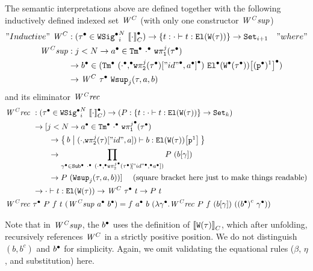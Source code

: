 The semantic interpretations above are defined together with the following inductively defined indexed set $\mathit{W}^C$ (with only one constructor $\mathit{W^Csup}$)
%
\begin{align*}
  "Inductive"~\mathit{W}^C &: ({\tau}^\bullet \in {\ensuremath{{\texttt{WSig}}^\bullet}}_{i}^{N}~{{\llbracket {\cdot} \rrbracket}_C^\bullet}) \to \{ t :  {\cdot} \vdash {t} : {\texttt{El}({\texttt{W}({\tau})})}  \} \to \texttt{Set}_{i + 1} \quad "where" \\
    \mathit{W^Csup} &: j < N \to {a}^\bullet \in {\texttt{Tm}}^\bullet~{{\cdot}^\bullet}~{\texttt{w}\pi^{j}_{\texttt{1}}({{\tau}^\bullet})} \\
    & \to {b}^\bullet \in ({\texttt{Tm}}^\bullet~{({\cdot}^\bullet {,}^\bullet {\ensuremath{\texttt{w}\pi^{j}_{\texttt{2}}({{\tau}^\bullet})}}\!\left[{{{"id"}^\bullet},{{a}^\bullet}}\right]^\bullet) }~{{{\texttt{El}}^\bullet({{\texttt{W}}^\bullet({{\tau}^\bullet})})}\!\left[{(\texttt{p}^\bullet)^{1}}\right]^\bullet}) \\
    & \to \mathit{W}^C~{\tau}^\bullet~\texttt{Wsup}_{j}({\tau},{a},{b})
\end{align*}
and its eliminator $\mathit{W^Crec}$
\begin{align*}
  \CWrec \  &: (\Glued{\wsig} \in \GWSig{i}{\denotesCC{\cdot}}{N}) \to 
    (P : \{ t : \goodTerm{\cdot}{t}{\El{\wcode{\wsig}}} \} \to \Set{k})  \\
    & \to 
    [j < N \to  \Glued{a} \in \GTm{\Glued{\cdot}}{\Gwsigproj{j}{1}{\Glued{\wsig}}} \\ 
    & \quad \quad \to 
    \setc{b}{\goodTerm{({\cdot} {,} \sub{\wsigproj{j}{2}{{\wsig}}}{\SubstExt{"id"}{{a}}}) }{b}{\sub{\El{\wcode{\wsig}}}{\SubstWeak{1}}}} \\ 
    & \quad \quad \to  \prod_{\Glued{\gm} \in \GSub{\Glued{\cdot}}{(\Glued{\cdot} \Glued{,} \sub{\Gwsigproj{j}{2}{\Glued{\wsig}}}{\GSubstExt{\GSubstId}{\Glued{a}}})}} P~(\sub{b}{ \gm }) \\
    & \quad \quad \to P~(\Wsup{j}{\wsig}{a}{b}) ] \quad \text{ (square bracket here just to make things readable)} \\
    & \to \goodTerm{\cdot}{t}{\El{\wcode{\wsig}}} \to \CWmodel~\Glued{\wsig}~t \to P~t \\
  \CWrec \  & \Glued{\wsig}~P~f~t~(\CWsup~\Glued{a}~\Glued{b}) = f~\Glued{a}~b~(\lambda \Glued{\gm}. \CWrec~P~f~(\sub{b}{\gm})~(\Gmodel{\Glued{b}}~\Glued{\gm}))
\end{align*}

Note that in $\mathit{W^Csup}$, the ${b}^\bullet$ uses the definition of
${\llbracket {\ensuremath{\texttt{W}({\tau})}} \rrbracket}_C$, which after unfolding, recursively references $\mathit{W}^C$
in a strictly positive position. %
We do not distinguish $(b, b^c)$ and ${b}^\bullet$ for simplicity. Again, we omit validating the equational rules ($\beta$, $\eta$, and substitution) here.


